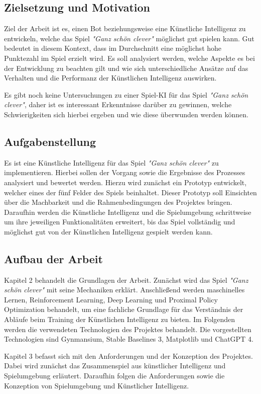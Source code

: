 \subsection{Zielsetzung und Motivation}
Ziel der Arbeit ist es, einen Bot beziehungsweise eine Künstliche Intelligenz zu entwickeln, welche das Spiel \textit{"Ganz schön clever"} möglichst gut spielen kann. Gut bedeutet in diesem Kontext, dass im Durchschnitt eine möglichst hohe Punktezahl im Spiel erzielt wird. Es soll analysiert werden, welche Aspekte es bei der Entwicklung zu beachten gilt und wie sich unterschiedliche Ansätze auf das Verhalten und die Performanz der Künstlichen Intelligenz auswirken.

Es gibt noch keine Untersuchungen zu einer Spiel-KI für das Spiel \textit{"Ganz schön clever"}, daher ist es interessant Erkenntnisse darüber zu gewinnen, welche Schwierigkeiten sich hierbei ergeben und wie diese überwunden werden können.
\subsection{Aufgabenstellung}
Es ist eine Künstliche Intelligenz für das Spiel \textit{"Ganz schön clever"} zu implementieren. Hierbei sollen der Vorgang sowie die Ergebnisse des Prozesses analysiert und bewertet werden. Hierzu wird zunächst ein Prototyp entwickelt, welcher eines der fünf Felder des Spiels beinhaltet. Dieser Prototyp soll Einsichten über die Machbarkeit und die Rahmenbedingungen des Projektes bringen. Daraufhin werden die Künstliche Intelligenz und die Spielumgebung schrittweise um ihre jeweiligen Funktionalitäten erweitert, bis das Spiel vollständig und möglichst gut von der Künstlichen Intelligenz gespielt werden kann.
\subsection{Aufbau der Arbeit}
Kapitel 2 behandelt die Grundlagen der Arbeit. Zunächst wird das Spiel \textit{"Ganz schön clever"} mit seine Mechaniken erklärt. Anschließend werden maschinelles Lernen, Reinforcement Learning, Deep Learning und Proximal Policy Optimization behandelt, um eine fachliche Grundlage für das Verständnis der Abläufe beim Training der Künstlichen Intelligenz zu bieten. Im Folgenden werden die verwendeten Technologien des Projektes behandelt. Die vorgestellten Technologien sind Gynmansium, Stable Baselines 3, Matplotlib und ChatGPT 4.

Kapitel 3 befasst sich mit den Anforderungen und der Konzeption des Projektes. Dabei wird zunächst das Zusammenspiel aus künstlicher Intelligenz und Spielumgebung erläutert. Daraufhin folgen die Anforderungen sowie die Konzeption von Spielumgebung und Künstlicher Intelligenz.

